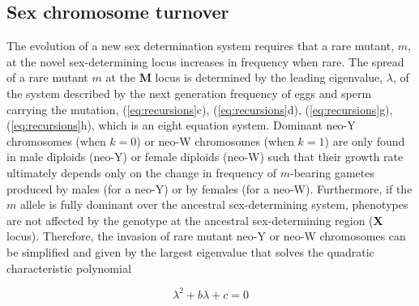 \documentclass[12pt]{article}
\begin{document}

\subsection*{Sex chromosome turnover}
The evolution of a new sex determination system requires that a rare mutant, $m$, at the novel sex-determining locus  increases in frequency when rare. 
The spread of a rare mutant $m$ at the \textbf{M} locus is determined by the leading eigenvalue, $\lambda$, of the system described by the next generation frequency of eggs and sperm carrying the mutation, (\ref{eq:recursions}c), (\ref{eq:recursions}d), (\ref{eq:recursions}g), (\ref{eq:recursions}h), which is an eight equation system. %
Dominant neo-Y chromosomes (when $k=0$) or neo-W chromosomes (when $k=1$) are only found in male diploids (neo-Y) or female diploids (neo-W) such that their growth rate ultimately depends only on the change in frequency of $m$-bearing gametes produced by males (for a neo-Y) or by females (for a neo-W). 
Furthermore, if the $m$ allele is fully dominant over the ancestral sex-determining system, phenotypes are not affected by the genotype at the ancestral sex-determining region (\textbf{X} locus). 
Therefore, the invasion of rare mutant neo-Y or neo-W chromosomes can be simplified and given by the largest eigenvalue that solves the quadratic characteristic polynomial

\begin{equation}
\lambda^2+ b \lambda + c =0
\label{eq:charpoly_neoY}
\end{equation}
\end{document}
